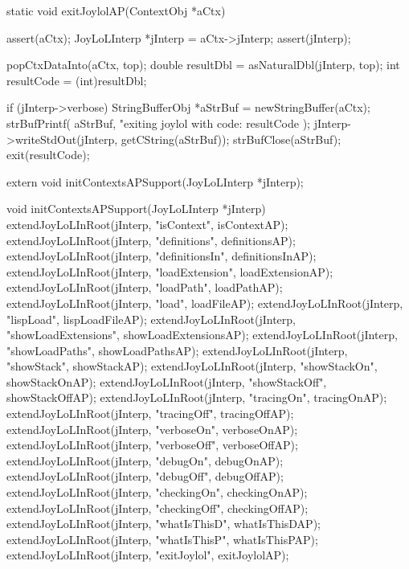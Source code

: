 \startCCode
static void exitJoylolAP(ContextObj *aCtx) {
  assert(aCtx);
  JoyLoLInterp *jInterp = aCtx->jInterp;
  assert(jInterp);
  
  popCtxDataInto(aCtx, top);
  double resultDbl  = asNaturalDbl(jInterp, top);
  int    resultCode = (int)resultDbl;
  
  if (jInterp->verbose) {
    StringBufferObj *aStrBuf = newStringBuffer(aCtx);
    strBufPrintf(
      aStrBuf,
      "exiting joylol with code: %
      resultCode
    );
    jInterp->writeStdOut(jInterp, getCString(aStrBuf));
    strBufClose(aStrBuf);
  }
  exit(resultCode);
}
\stopCCode

\startCHeader
extern void initContextsAPSupport(JoyLoLInterp *jInterp);
\stopCHeader
{}

\startCCode
void initContextsAPSupport(JoyLoLInterp *jInterp) {
  extendJoyLoLInRoot(jInterp, "isContext",           isContextAP);
  extendJoyLoLInRoot(jInterp, "definitions",         definitionsAP);
  extendJoyLoLInRoot(jInterp, "definitionsIn",       definitionsInAP);
  extendJoyLoLInRoot(jInterp, "loadExtension",       loadExtensionAP);
  extendJoyLoLInRoot(jInterp, "loadPath",            loadPathAP);
  extendJoyLoLInRoot(jInterp, "load",                loadFileAP);
  extendJoyLoLInRoot(jInterp, "lispLoad",            lispLoadFileAP);
  extendJoyLoLInRoot(jInterp, "showLoadExtensions",  showLoadExtensionsAP);
  extendJoyLoLInRoot(jInterp, "showLoadPaths",       showLoadPathsAP);
  extendJoyLoLInRoot(jInterp, "showStack",           showStackAP);
  extendJoyLoLInRoot(jInterp, "showStackOn",         showStackOnAP);
  extendJoyLoLInRoot(jInterp, "showStackOff",        showStackOffAP);
  extendJoyLoLInRoot(jInterp, "tracingOn",           tracingOnAP);
  extendJoyLoLInRoot(jInterp, "tracingOff",          tracingOffAP);
  extendJoyLoLInRoot(jInterp, "verboseOn",           verboseOnAP);
  extendJoyLoLInRoot(jInterp, "verboseOff",          verboseOffAP);
  extendJoyLoLInRoot(jInterp, "debugOn",             debugOnAP);
  extendJoyLoLInRoot(jInterp, "debugOff",            debugOffAP);
  extendJoyLoLInRoot(jInterp, "checkingOn",          checkingOnAP);
  extendJoyLoLInRoot(jInterp, "checkingOff",         checkingOffAP);
  extendJoyLoLInRoot(jInterp, "whatIsThisD",         whatIsThisDAP);
  extendJoyLoLInRoot(jInterp, "whatIsThisP",         whatIsThisPAP);
  extendJoyLoLInRoot(jInterp, "exitJoylol",          exitJoylolAP);
}
\stopCCode